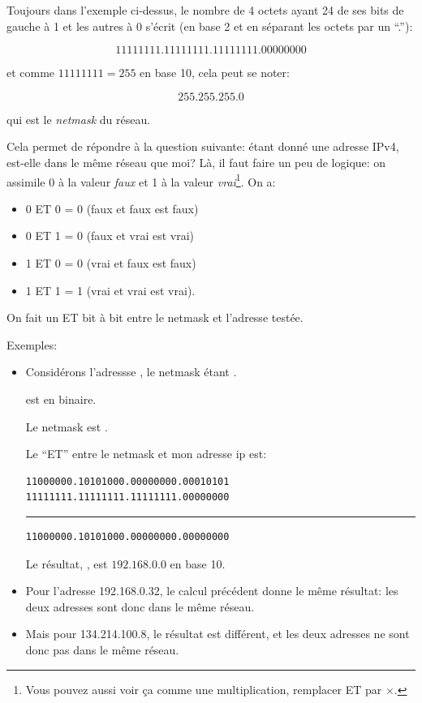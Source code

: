 Toujours dans l'exemple ci-dessus, le nombre de 4 octets ayant 24 de ses
bits de gauche à 1 et les autres à 0 s'écrit (en base 2 et en séparant
les octets par un ``.''): 

$$11111111.11111111.11111111.00000000$$

et comme $11111111 = 255$ en base 10, cela peut se noter:

$$255.255.255.0$$

qui est le \emph{netmask} du réseau.

Cela permet de répondre à la question suivante: étant donné une
adresse IPv4, est-elle dans le même réseau que moi? Là, il faut faire
un peu de logique: on assimile 0 à la valeur \emph{faux} et 1 à la
valeur \emph{vrai}\footnote{Vous pouvez aussi voir ça comme une
  multiplication, remplacer ET par $\times$.}. On a: 

\begin{itemize}
\item 0 ET 0 = 0 (faux et faux est faux)
\item 0 ET 1 = 0 (faux et vrai est vrai)
\item 1 ET 0 = 0 (vrai et faux est faux)
\item 1 ET 1 = 1 (vrai et vrai est vrai).
\end{itemize}


 On fait un \og ET\fg{} bit à bit entre le netmask et l'adresse
 testée.

 Exemples:
 \begin{itemize}
 \item Considérons l'adressse , le netmask étant
 . 

    est  en
   binaire.

   Le netmask est .

   Le ``ET''
   entre le netmask et mon adresse ip est:

   \begin{center}
     \begin{minipage}{0.44\textwidth}
       \begin{flushleft}
\begin{verbatim}
11000000.10101000.00000000.00010101
11111111.11111111.11111111.00000000
\end{verbatim}
\rule{\textwidth}{.1pt}
\begin{verbatim}
11000000.10101000.00000000.00000000
\end{verbatim}
     \end{flushleft}
     \end{minipage}
   \end{center}

  Le résultat,  , est $192.168.0.0$ en
   base 10.
   
   
 \item Pour l'adresse 192.168.0.32, le calcul précédent donne le même
   résultat: les deux adresses sont donc dans le même réseau.
 \item Mais pour 134.214.100.8, le résultat est différent, et les deux
   adresses ne sont donc pas dans le même réseau.
\end{itemize}
   
